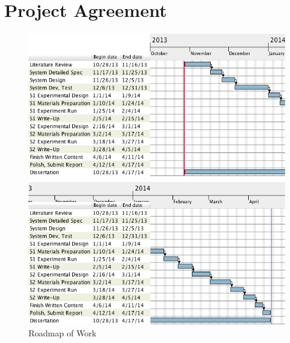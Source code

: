 \documentclass[a4paper, 11pt]{article}
\begin{document}
\section{Project Agreement}
\signature{Student Signature}{\mysig}
\signature{Supervisor Signature}{}
\begin{figure}[ht]
\centering
\includegraphics[width=\linewidth]{roadmapcrop2}
\caption{Roadmap of Work}
\label{fig:roadmap}
\end{figure}
%
%
\printglossary[title=Terms]

\printbibliography
\end{document}

